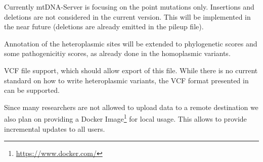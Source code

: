  Currently mtDNA-Server is focusing on the point mutations only. Insertions and deletions are not considered in the current version. This will be implemented in the near future (deletions are already emitted in the pileup file).
 
 Annotation of the heteroplasmic sites will be extended to phylogenetic scores and some pathogenicitiy scores, as already done in the homoplasmic variants. 

VCF file support, which should allow export of this file. While there is no current standard on how to write heteroplasmic variants, the VCF format presented in \cite{Calabrese2014} can be supported.

Since many researchers are not allowed to upload data to a remote destination we also plan on providing a Docker Image\footnote{\url{https://www.docker.com/}} for local usage. This allows to provide incremental updates to all users.  








